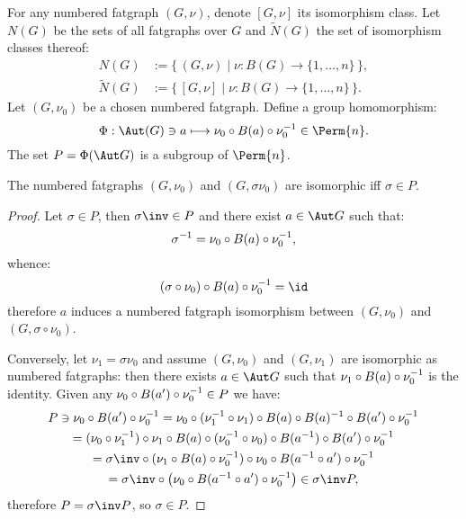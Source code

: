 For any numbered fatgraph $(G, \nu)$, denote $[G, \nu]$ its
isomorphism class.  Let $N(G)$ be the sets of all fatgraphs over $G$
and $\tilde N(G)$ the set of isomorphism classes thereof:
\begin{align*}
  N(G) &:= \{\, (G,\nu) \;|\; \nu\colon B(G) \to \{1,\ldots,n\} \,\},
  \\
  \tilde N(G) &:= \{\, [G,\nu] \;|\; \nu\colon B(G) \to \{1,\ldots,n\} \,\}.
\end{align*}
Let $(G, \nu_0)$ be a chosen numbered fatgraph.  Define a group
homomorphism:
\begin{equation}\label{eq:Phi}
\Phi: \Aut(G) \ni a \longmapsto \nu_0 \circ \Holes{a} \circ
\nu_0^{-1} \in \Perm{n}.
\end{equation}
The set $P = \Phi(\Aut G)$ is a subgroup of $\Perm{n}$.
\begin{lemma}\label{lemma:sigma}
  The numbered fatgraphs $(G, \nu_0)$ and $(G, \sigma\nu_0)$ are
  isomorphic iff $\sigma \in P$.
\end{lemma}
\begin{proof}
  Let $\sigma \in P$, then $\sigma\inv \in P$ and there
  exist $a \in \Aut G$ such that:
  \begin{equation*}
    \sigma^{-1} = \nu_0 \circ B(a) \circ \nu_0^{-1},
  \end{equation*}
  whence:
  \begin{equation*}
    (\sigma \circ \nu_0) \circ \Holes{a} \circ \nu_0^{-1} = \id
  \end{equation*}
  therefore $a$ induces a numbered fatgraph isomorphism
  between $(G, \nu_0)$ and $(G, \sigma \circ \nu_0)$.

  Conversely, let $\nu_1 = \sigma\nu_0$ and assume $(G, \nu_0)$ and
  $(G, \nu_1)$ are isomorphic as numbered fatgraphs: then there exists
  $a \in \Aut G$ such that $\nu_1 \circ B(a) \circ \nu_0^{-1}$ is
  the identity. Given any $\nu_0 \circ B(a') \circ \nu_0^{-1} \in
  P$ we have:
  \begin{multline*}
    P \ni \nu_0 \circ \Holes{a'} \circ \nu_0^{-1} 
    = \nu_0 \circ (\nu_1^{-1} \circ \nu_1) 
      \circ \Holes{a} \circ \Holes{a}^{-1}
      \circ \Holes{a'} \circ \nu_0^{-1} 
    \\
    = (\nu_0 \circ \nu_1^{-1}) \circ \nu_1 \circ \Holes{a}
      \circ (\nu_0^{-1} \circ \nu_0) \circ \Holes{a^{-1}} 
      \circ \Holes{a'} \circ \nu_0^{-1} 
    \\
    = \sigma\inv \circ (\nu_1 \circ
      \Holes{a} \circ \nu_0^{-1}) \circ \nu_0 \circ \Holes{a^{-1} \circ
      a'} \circ \nu_0^{-1}
    \\
    = \sigma\inv \circ \left( \nu_0 \circ
      \Holes{a^{-1} \circ a'} \circ \nu_0^{-1} \right)
    \in \sigma\inv P,
  \end{multline*}
  therefore $P = \sigma\inv P$, so $\sigma \in P$.
\end{proof}

